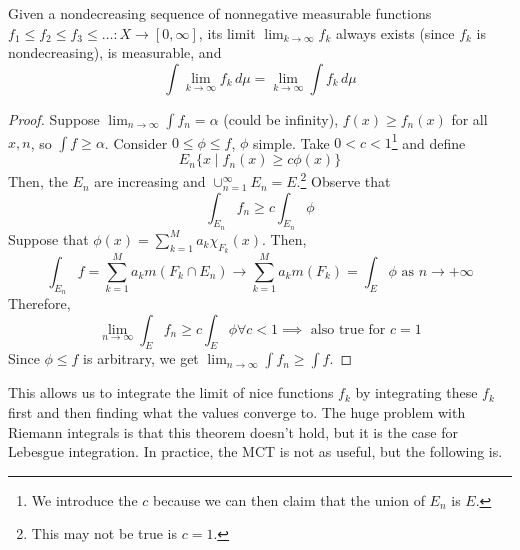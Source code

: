   \begin{theorem}
    Given a nondecreasing sequence of nonnegative measurable functions $f_1 \leq f_2 \leq f_3 \leq \ldots : X \longrightarrow [0, \infty]$, its limit $\lim_{k \rightarrow \infty} f_k$ always exists (since $f_k$ is nondecreasing), is measurable, and 
    \begin{equation}
      \int \lim_{k \rightarrow \infty} f_k \, d\mu = \lim_{k \rightarrow \infty} \int f_k \, d\mu
    \end{equation}
  \end{theorem}
  \begin{proof}
    Suppose $\lim_{n \to \infty} \int f_n = \alpha$ (could be infinity), $f(x) \geq f_n (x)$ for all $x, n$, so $\int f \geq \alpha$. Consider $0 \leq \phi \leq f$, $\phi$ simple. Take $0 < c < 1$\footnote{We introduce the $c$ because we can then claim that the union of $E_n$ is $E$.} and define 
    \begin{equation}
      E_n \{x \mid f_n (x) \geq c \phi(x) \} 
    \end{equation} 
    Then, the $E_n$ are increasing and $\cup_{n=1}^\infty E_n = E$.\footnote{This may not be true is $c = 1$.} Observe that 
    \begin{equation}
      \int_{E_n} f_n \geq c \int_{E_n} \phi 
    \end{equation}
    Suppose that $\phi (x) = \sum_{k=1}^M a_k \chi_{F_k} (x)$. Then, 
    \begin{equation}
      \int_{E_n} f = \sum_{k=1}^M a_k m(F_k \cap E_n) \to \sum_{k=1}^M a_k m(F_k) = \int_E \phi \text{ as } n \to +\infty
    \end{equation} 
    Therefore, 
    \begin{equation}
      \lim_{n \to \infty} \int_E f_n \geq c \int_E \phi \forall c < 1 \implies \text{ also true for } c = 1
    \end{equation}
    Since $\phi \leq f$ is arbitrary, we get $\lim_{n \to \infty} \int f_n \geq \int f $. 
  \end{proof}

  This allows us to integrate the limit of nice functions $f_k$ by integrating these $f_k$ first and then finding what the values converge to. The huge problem with Riemann integrals is that this theorem doesn't hold, but it is the case for Lebesgue integration. In practice, the MCT is not as useful, but the following is. 

